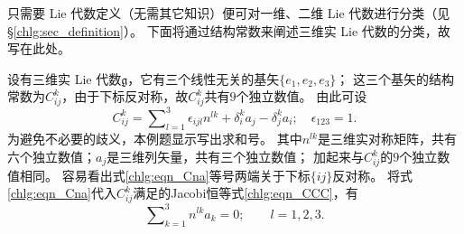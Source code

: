 只需要 Lie 代数定义（无需其它知识）便可对一维、二维 Lie 代数进行分类（见\S\ref{chlg:sec_definition}）。
下面将通过结构常数来阐述三维实 Lie 代数的分类\cite[\S 116]{landau_2-classical-fields}，故写在此处。


设有三维实 Lie 代数$\mathfrak{g}$，它有三个线性无关的基矢$\{e_1,e_2,e_3\}$；
这三个基矢的结构常数为$C^k_{ij}$，由于下标反对称，故$C^k_{ij}$共有$9$个独立数值。
由此可设
\begin{equation}\label{chlg:eqn_Cna}
	C^k_{ij} = \sum\nolimits_{l=1}^{3}\epsilon_{ijl} n^{lk} + \delta^k_i a_j - \delta^k_j a_i ; 
	\quad \epsilon_{123} =1.	
\end{equation}
为避免不必要的歧义，本例题显示写出求和号。
其中$n^{lk}$是三维实对称矩阵，共有六个独立数值；$a_j$是三维列矢量，共有三个独立数值；
加起来与$C^k_{ij}$的$9$个独立数值相同。
容易看出式\eqref{chlg:eqn_Cna}等号两端关于下标$\{ij\}$反对称。
将式\eqref{chlg:eqn_Cna}代入$C^k_{ij}$满足的Jacobi恒等式\eqref{chlg:eqn_CCC}，有
\begin{equation}\label{chlg:eqn_Jacobi-na}
	\sum\nolimits_{k=1}^{3}n^{lk} a_k =0;\qquad l=1,2,3.
\end{equation}
